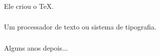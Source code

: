 \documentclass[aspectratio=169]{beamer}
\begin{document}
{%

  \begin{frame}
  \end{frame}
}

\begin{frame}\frametitle{}
  \begin{center}
    \Huge Ele criou o \TeX.
  \end{center}
\end{frame}

\begin{frame}\frametitle{}
  \begin{center}
    \Huge Um processador de texto ou sistema de tipografia.
  \end{center}
\end{frame}

\begin{frame}\frametitle{}
  \begin{center}
    \Huge Alguns anos depois...
  \end{center}
\end{frame}
\end{document}
